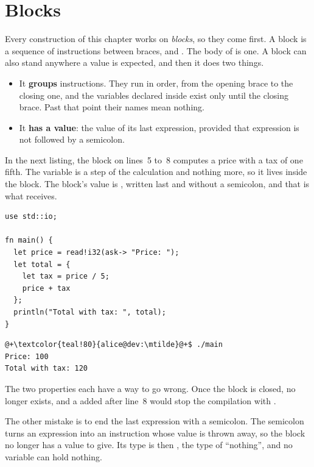\vfill\pagebreak
\section{Blocks}
\label{sec:control:blocks}

Every construction of this chapter works on \textit{blocks}, so they come first.
A block is a sequence of instructions between braces, \token{\{} and \token{\}}.
The body of  is one. A block can also stand anywhere a value is
expected, and then it does two things.

\begin{itemize}
\item It \textbf{groups} instructions. They run in order, from the opening
  brace to the closing one, and the variables declared inside exist only until
  the closing brace. Past that point their names mean nothing.
\item It \textbf{has a value}: the value of its last expression, provided that
  expression is not followed by a semicolon.
\end{itemize}

In the next listing, the block on lines~5 to~8 computes a price with a tax of
one fifth. The variable  is a step of the calculation and nothing
more, so it lives inside the block. The block's value is ,
written last and without a semicolon, and that is what  receives.

\begin{lstlisting}[style=coloredverbatim, caption=A block used as a value, label=lst:control:block_value]
use std::io;

fn main() {
  let price = read!i32(ask-> "Price: ");
  let total = {
    let tax = price / 5;
    price + tax
  };
  println("Total with tax: ", total);
}
\end{lstlisting}
\vspace{-10pt}%
\begin{lstlisting}[style=bashVerb, escapechar=@+]
@+\textcolor{teal!80}{alice@dev:\mtilde}@+$ ./main
Price: 100
Total with tax: 120
\end{lstlisting}

The two properties each have a way to go wrong. Once the block is closed,
 no longer exists, and a  added after line~8
would stop the compilation with .

The other mistake is to end the last expression with a semicolon. The semicolon
turns an expression into an instruction whose value is thrown away, so the block
no longer has a value to give. Its type is then , the type of
``nothing'', and no variable can hold nothing.

